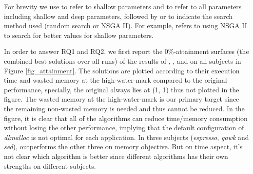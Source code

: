 For brevity we use \emph{\shallow} to refer to shallow parameters and \emph{\all} to refer to all parameters including shallow and deep parameters, followed by \emph{\randomsearch} or \emph{\nsgaii} to indicate the search method used (random search or NSGA II). For example, \sn{} refers to using NSGA II to search for better values for shallow parameters.

\begin{figure*}[htb]
	\centering
	\subfigure[espresso]{
		\label{fig_attainment_espresso}
		\texttt{[image: espresso\_attainment\_best]}%
	}
	\subfigure[gawk]{
		\label{fig_attainment_gawk}
		\texttt{[image: gawk\_attainment\_best]}%
	}
	\subfigure[flex]{
		\label{fig_attainment_flex}
		\texttt{[image: flex\_attainment\_best]}%
	}
	\subfigure[sed]{
		\label{fig_attainment_sed}
		\texttt{[image: sed\_attainment\_best]}%
	}
	\caption{0\%, 50\%, 100\%-attainment surfaces of the results of \sr{}, \sn{}, \dr{}, \dn{} over 20 runs for each application.}\label{fig_attainment}
\end{figure*}

In order to answer RQ1 and RQ2, we first report the 0\%-attainment surfaces (the combined best solutions over all runs) of the results of \sr{}, \sn{}, \dr{} and \dn{} on all subjects in Figure \ref{fig_attainment}. The solutions are plotted according to their execution time and wasted memory at the high-water-mark compared to the original performance, specially, the original always lies at (1, 1) thus not plotted in the figure. The wasted memory at the high-water-mark is our primary target since the remaining non-wasted memory is needed and thus cannot be reduced. 
In the figure, it is clear that all of the algorithms can reduce time/memory consumption without losing the other performance, implying that the default configuration of \emph{dlmalloc} is not optimal for each application. In three subjects (\emph{espresso}, \emph{gawk} and \emph{sed}), \dn{} outperforms the other three on memory objective. But on time aspect, it's not clear which algorithm is better since different algorithms has their own strengths on different subjects. 

